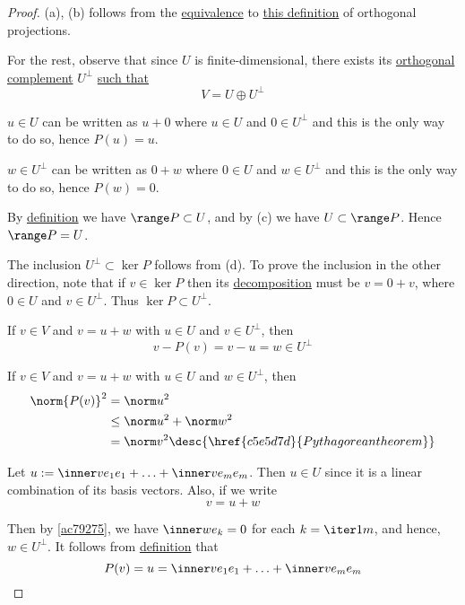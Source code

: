\begin{proof}
  (a), (b) follows from the \href{f18d94f}{equivalence} to \href{fb705a2}{this
  definition} of orthogonal projections.

  For the rest, observe that since $U$ is finite-dimensional, there exists its
  \href{c3c519f}{orthogonal complement} $U^\perp$ \href{d7635df}{such that}
  $$
    V=U\oplus U^\perp
  $$

   $u\in U$ can be written as $u+0$ where $u\in U$ and $0\in
  U^\perp$ and this is the only way to do so, hence $P(u)=u$.

   $w\in U^\perp$ can be written as $0+w$ where $0\in U$ and $w\in
  U^\perp$ and this is the only way to do so, hence $P(w)=0$.

   By \href{dbfa2fa}{definition} we have $\range P\subset U$, and by
  (c) we have $U\subset\range P$. Hence $\range P=U$.

   The inclusion $U^\perp\subset\ker P$ follows from (d). To prove
  the inclusion in the other direction, note that if $v\in\ker P$ then its
  \href{fb705a2}{decomposition} must be $v=0+v$, where $0\in U$ and $v\in
  U^\perp$. Thus $\ker P\subset U^\perp$.

   If $v\in V$ and $v=u+w$ with $u\in U$ and $v\in U^\perp$, then
  $$
    v-P(v)=v-u=w\in U^\perp
  $$

   If $v\in V$ and $v=u+w$ with $u\in U$ and $w\in U^\perp$, then
  \begin{align*}
    \norm{P(v)}^2 &=\norm u^2                                           \\
                  &\leq\norm u^2+\norm w^2                              \\
                  &=\norm v^2\desc{\href{c5e5d7d}{Pythagorean theorem}}
  \end{align*}


  Let $u:=\inner v{e_1}e_1+\ldots+\inner v{e_m}e_m$. Then $u\in U$ since it is
  a linear combination of its basis vectors. Also, if we write
  $$
    v=u+w
  $$

  Then by \autoref{ac79275}, we have $\inner w{e_k}=0$ for each $k=\iter1m$,
  and hence, $w\in U^\perp$. It follows from \href{dbfa2fa}{definition} that
  $$
    P(v)=u=\inner v{e_1}e_1+\ldots+\inner v{e_m}e_m
  $$
\end{proof}

\label{a1f36df}

